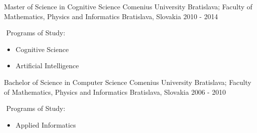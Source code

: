 

\begin{cventries}

  \cventry
    {Master of Science in Cognitive Science} %
    {Comenius University Bratislava; Faculty of Mathematics, Physics and Informatics} %
    {Bratislava, Slovakia} %
    {2010 - 2014} %
    {
      \begin{cvitems} %
        \item[$$] {Programs of Study:}
        \begin{itemize}[leftmargin=3ex, label=\bullet]
          \item {Cognitive Science}
          \item {Artificial Intelligence}
        \end{itemize}
      \end{cvitems}
    }

  \cventry
    {Bachelor of Science in Computer Science} %
    {Comenius University Bratislava; Faculty of Mathematics, Physics and Informatics} %
    {Bratislava, Slovakia} %
    {2006 - 2010} %
    {
      \begin{cvitems} %
        \item[$$] {Programs of Study:}
        \begin{itemize}[leftmargin=3ex, label=\bullet]
          \item {Applied Informatics}
        \end{itemize}
      \end{cvitems}
    }

\end{cventries}
